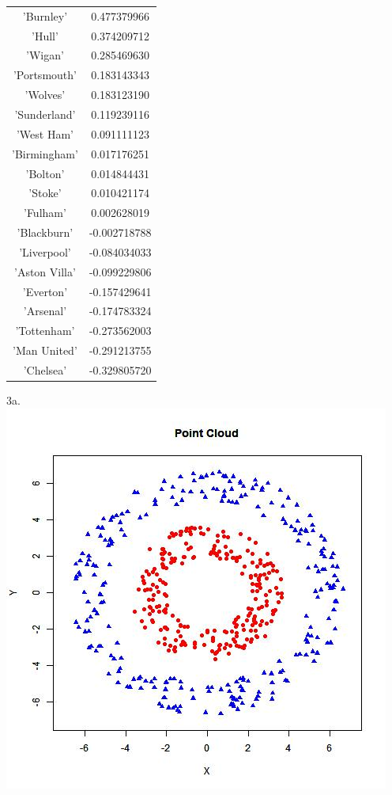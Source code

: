 \documentclass[12pt]{article}
\begin{document}
\begin{tabular}{|c|c|}
\hline
'Burnley'     & 0.477379966\\
'Hull'        & 0.374209712\\
'Wigan'       & 0.285469630\\
'Portsmouth'  & 0.183143343\\
'Wolves'      & 0.183123190\\
'Sunderland'  & 0.119239116\\
'West Ham'    & 0.091111123\\
'Birmingham'  & 0.017176251\\
'Bolton'      & 0.014844431\\
'Stoke'       & 0.010421174\\
'Fulham'      & 0.002628019\\
'Blackburn'   &-0.002718788\\
'Liverpool'   &-0.084034033\\
'Aston Villa' &-0.099229806\\
'Everton'     &-0.157429641\\
'Arsenal'     &-0.174783324\\
'Tottenham'   &-0.273562003\\
'Man United'  &-0.291213755\\
'Chelsea'     &-0.329805720\\
\hline
\end{tabular}
\newpage
3a.\\
\includegraphics[scale = .65]{pointCloud.jpeg} \\
\end{document}
